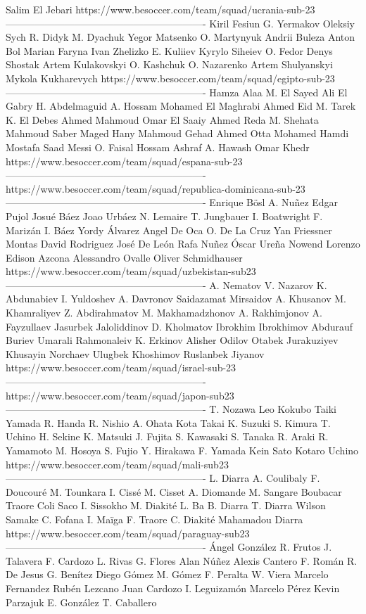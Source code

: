 Salim El Jebari
https://www.besoccer.com/team/squad/ucrania-sub-23 
------------------------------------------------------------- 
Kiril Fesiun
G. Yermakov
Oleksiy Sych
R. Didyk
M. Dyachuk
Yegor Matsenko
O. Martynyuk
Andrii Buleza
Anton Bol
Marian Faryna
Ivan Zhelizko
E. Kuliiev
Kyrylo Siheiev
O. Fedor
Denys Shostak
Artem Kulakovskyi
O. Kashchuk
O. Nazarenko
Artem Shulyanskyi
Mykola Kukharevych
https://www.besoccer.com/team/squad/egipto-sub-23 
------------------------------------------------------------- 
Hamza Alaa
M. El Sayed
Ali El Gabry
H. Abdelmaguid
A. Hossam
Mohamed El Maghrabi
Ahmed Eid
M. Tarek
K. El Debes
Ahmed Mahmoud
Omar El Saaiy
Ahmed Reda
M. Shehata
Mahmoud Saber
Maged Hany
Mahmoud Gehad
Ahmed Otta
Mohamed Hamdi
Mostafa Saad Messi
O. Faisal
Hossam Ashraf
A. Hawash
Omar Khedr
https://www.besoccer.com/team/squad/espana-sub-23 
------------------------------------------------------------- 
https://www.besoccer.com/team/squad/republica-dominicana-sub-23 
------------------------------------------------------------- 
Enrique Bösl
A. Nuñez
Edgar Pujol
Josué Báez
Joao Urbáez
N. Lemaire
T. Jungbauer
I. Boatwright
F. Marizán
I. Báez
Yordy Álvarez
Angel De Oca
O. De La Cruz
Yan Friessner Montas
David Rodriguez
José De León
Rafa Nuñez
Óscar Ureña
Nowend Lorenzo
Edison Azcona
Alessandro Ovalle
Oliver Schmidhauser
https://www.besoccer.com/team/squad/uzbekistan-sub23 
------------------------------------------------------------- 
A. Nematov
V. Nazarov
K. Abdunabiev
I. Yuldoshev
A. Davronov
Saidazamat Mirsaidov
A. Khusanov
M. Khamraliyev
Z. Abdirahmatov
M. Makhamadzhonov
A. Rakhimjonov
A. Fayzullaev
Jasurbek Jaloliddinov
D. Kholmatov
Ibrokhim Ibrokhimov
Abdurauf Buriev
Umarali Rahmonaleiv
K. Erkinov
Alisher Odilov
Otabek Jurakuziyev
Khusayin Norchaev
Ulugbek Khoshimov
Ruslanbek Jiyanov
https://www.besoccer.com/team/squad/israel-sub-23 
------------------------------------------------------------- 
https://www.besoccer.com/team/squad/japon-sub23 
------------------------------------------------------------- 
T. Nozawa
Leo Kokubo
Taiki Yamada
R. Handa
R. Nishio
A. Ohata
Kota Takai
K. Suzuki
S. Kimura
T. Uchino
H. Sekine
K. Matsuki
J. Fujita
S. Kawasaki
S. Tanaka
R. Araki
R. Yamamoto
M. Hosoya
S. Fujio
Y. Hirakawa
F. Yamada
Kein Sato
Kotaro Uchino
https://www.besoccer.com/team/squad/mali-sub23 
------------------------------------------------------------- 
L. Diarra
A. Coulibaly
F. Doucouré
M. Tounkara
I. Cissé
M. Cisset
A. Diomande
M. Sangare
Boubacar Traore
Coli Saco
I. Sissokho
M. Diakité
L. Ba
B. Diarra
T. Diarra
Wilson Samake
C. Fofana
I. Maïga
F. Traore
C. Diakité
Mahamadou Diarra
https://www.besoccer.com/team/squad/paraguay-sub23 
------------------------------------------------------------- 
Ángel González
R. Frutos
J. Talavera
F. Cardozo
L. Rivas
G. Flores
Alan Núñez
Alexis Cantero
F. Román
R. De Jesus
G. Benítez
Diego Gómez
M. Gómez
F. Peralta
W. Viera
Marcelo Fernandez
Rubén Lezcano
Juan Cardozo
I. Leguizamón
Marcelo Pérez
Kevin Parzajuk
E. González
T. Caballero
